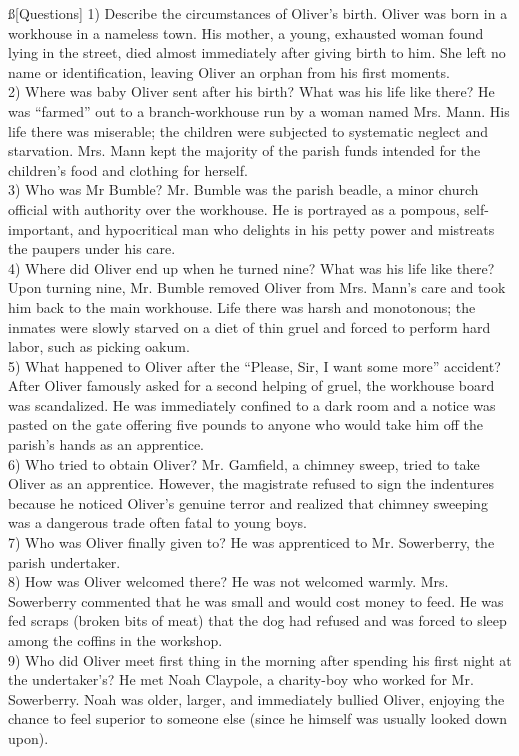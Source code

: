 \documentclass[12pt]{article}
\begin{document}
\ss[Questions]
1) Describe the circumstances of Oliver’s birth. Oliver was born in a workhouse in a nameless town. His mother, a young, exhausted woman found lying in the street, died almost immediately after giving birth to him. She left no name or identification, leaving Oliver an orphan from his first moments. \\
2) Where was baby Oliver sent after his birth? What was his life like there? He was “farmed” out to a branch-workhouse run by a woman named Mrs. Mann. His life there was miserable; the children were subjected to systematic neglect and starvation. Mrs. Mann kept the majority of the parish funds intended for the children's food and clothing for herself. \\
3) Who was Mr Bumble? Mr. Bumble was the parish beadle, a minor church official with authority over the workhouse. He is portrayed as a pompous, self-important, and hypocritical man who delights in his petty power and mistreats the paupers under his care. \\
4) Where did Oliver end up when he turned nine? What was his life like there? Upon turning nine, Mr. Bumble removed Oliver from Mrs. Mann’s care and took him back to the main workhouse. Life there was harsh and monotonous; the inmates were slowly starved on a diet of thin gruel and forced to perform hard labor, such as picking oakum. \\
5) What happened to Oliver after the “Please, Sir, I want some more” accident? After Oliver famously asked for a second helping of gruel, the workhouse board was scandalized. He was immediately confined to a dark room and a notice was pasted on the gate offering five pounds to anyone who would take him off the parish's hands as an apprentice. \\
6) Who tried to obtain Oliver? Mr. Gamfield, a chimney sweep, tried to take Oliver as an apprentice. However, the magistrate refused to sign the indentures because he noticed Oliver’s genuine terror and realized that chimney sweeping was a dangerous trade often fatal to young boys. \\
7) Who was Oliver finally given to? He was apprenticed to Mr. Sowerberry, the parish undertaker. \\
8) How was Oliver welcomed there? He was not welcomed warmly. Mrs. Sowerberry commented that he was small and would cost money to feed. He was fed scraps (broken bits of meat) that the dog had refused and was forced to sleep among the coffins in the workshop. \\
9) Who did Oliver meet first thing in the morning after spending his first night at the undertaker’s? He met Noah Claypole, a charity-boy who worked for Mr. Sowerberry. Noah was older, larger, and immediately bullied Oliver, enjoying the chance to feel superior to someone else (since he himself was usually looked down upon). \\
\end{document}
